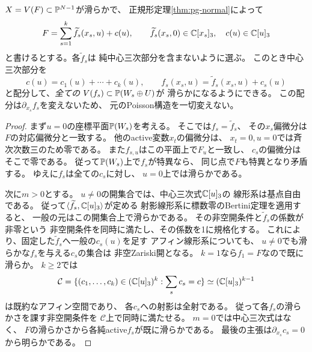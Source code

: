 \begin{lemma}[中心三次式の配分による全ブロックの滑らか化]
\label{lem:pg-central-splitting-smooth}
$X=V(F)\subset\mathbb P^{N-1}$が滑らかで、
正規形定理\ref{thm:pg-normal}によって
\begin{equation}
 F=\sum_{s=1}^k\widetilde f_s(x_s,u)+c(u),
 \qquad
 \widetilde f_s(x_s,0)\in\mathbb C[x_s]_3,\quad
 c(u)\in\mathbb C[u]_3
 \label{eq:pg-det-central-splitting}
\end{equation}
と書けるとする。各$\widetilde f_s$は
純中心三次部分を含まないように選ぶ。
このとき中心三次部分を
\begin{equation}
 c(u)=c_1(u)+\cdots+c_k(u),\qquad
 f_s(x_s,u)=\widetilde f_s(x_s,u)+c_s(u)
 \label{eq:pg-det-center-distribution}
\end{equation}
と配分して、\emph{全ての}
$V(f_s)\subset\mathbb P(W_s\oplus U)$が
滑らかになるようにできる。
この配分は$\partial_{x_s}f_s$を変えないため、
元のPoisson構造を一切変えない。
\end{lemma}
\begin{proof}
まず$u=0$の座標平面$\mathbb P(W_s)$を考える。
そこでは$f_s=\widetilde f_s$、
その$x_s$偏微分は$F$の対応偏微分と一致する。
他のactive変数$x_t$の偏微分は、
$x_t=0,u=0$では斉次次数三のため零である。
また$f_{s,u}$はこの平面上で$F_u$と一致し、
$c_s$の偏微分はそこで零である。
従って$\mathbb P(W_s)$上で$f_s$が特異なら、
同じ点で$F$も特異となり矛盾する。
ゆえに$f_s$は全ての$c_s$に対し、
$u=0$上では滑らかである。

次に$m>0$とする。
$u\ne0$の開集合では、中心三次式$\mathbb C[u]_3$の
線形系は基点自由である。
従って$\langle\widetilde f_s,\mathbb C[u]_3\rangle$が定める
射影線形系に標数零のBertini定理を適用すると、
一般の元はこの開集合上で滑らかである。
その非空開条件と$\widetilde f_s$の係数が非零という
非空開条件を同時に満たし、その係数を1に規格化する。
これにより、固定した$\widetilde f_s$へ一般の$c_s(u)$を足す
アフィン線形系についても、
$u\ne0$でも滑らかな$f_s$を与える$c_s$の集合は
非空Zariski開となる。
$k=1$なら$f_1=F$なので既に滑らか。
$k\ge2$では
\begin{equation}
 \mathcal C=
 \{(c_1,\ldots,c_k)\in(\mathbb C[u]_3)^k:
 \sum_sc_s=c\}\simeq(\mathbb C[u]_3)^{k-1}
 \label{eq:pg-det-distribution-space}
\end{equation}
は既約なアフィン空間であり、
各$c_s$への射影は全射である。
従って各$f_s$の滑らかさを課す非空開条件を
$\mathcal C$上で同時に満たせる。
$m=0$では中心三次式はなく、
$F$の滑らかさから各純active$f_s$が既に滑らかである。
最後の主張は$\partial_{x_s}c_s=0$から明らかである。
\end{proof}

